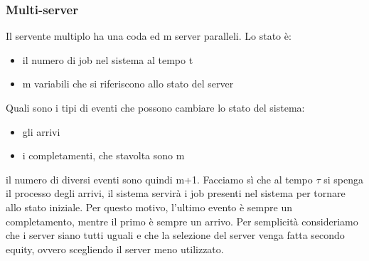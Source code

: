 \documentclass{article}
\begin{document}
\subsubsection{Multi-server}
Il servente multiplo ha una coda ed m server paralleli. Lo stato è:
\begin{itemize}
\item il numero di job nel sistema al tempo t
\item m variabili che si riferiscono allo stato del server 
\end{itemize}
Quali sono i tipi di eventi che possono cambiare lo stato del sistema:
\begin{itemize}
\item gli arrivi
\item i completamenti, che stavolta sono m
\end{itemize}
il numero di diversi eventi sono quindi m+1. Facciamo sì che al tempo $\tau$ si spenga il processo degli arrivi, il sistema servirà i job presenti nel sistema per tornare allo stato iniziale. Per questo motivo, l'ultimo evento è sempre un completamento, mentre il primo è sempre un arrivo. Per semplicità consideriamo che i server siano tutti uguali e che la selezione del server venga fatta secondo equity, ovvero scegliendo il server meno utilizzato.
\end{document}
